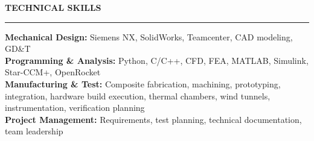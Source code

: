 \documentclass[10pt]{article}
\newcommand{\ressection}[1]{
  \vspace{0.12em}
  {\large\bfseries #1}\par
  \vspace{0.05em}\hrule\vspace{0.12em}
}
\begin{document}
\ressection{TECHNICAL SKILLS}

\textbf{Mechanical Design:} Siemens NX, SolidWorks, Teamcenter, CAD modeling, GD\&T \\
\textbf{Programming \& Analysis:} Python, C/C++, CFD, FEA, MATLAB, Simulink, Star-CCM+, OpenRocket \\
\textbf{Manufacturing \& Test:} Composite fabrication, machining, prototyping, integration, hardware build execution, thermal chambers, wind tunnels, instrumentation, verification planning \\
\textbf{Project Management:} Requirements, test planning, technical documentation, team leadership
\end{document}
